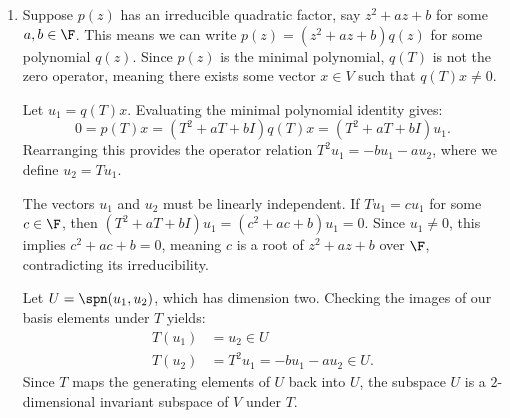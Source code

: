 \begin{solution}
\begin{enumerate}[label=\arabic*)]
\begin{itemize}
    To confirm linear independence, suppose $u=\alpha w$ for some
    $\alpha\in\F$. Then $(T-\lambda I)w=\alpha w$, so $w$ is an eigenvector of
    $T$ with eigenvalue $\lambda+\alpha$. But then
    $(T-\lambda I)^2w=\alpha^2w$. Since $(T-\lambda I)^2w=0$ and $w\ne0$, this
    forces $\alpha=0$, contradicting our deduction that $\alpha\ne0$ (since
    $u\ne0$). Therefore, $u$ and $w$ are linearly independent, and
    $\spn(u,w)$ is a $2$-dimensional invariant subspace of $V$ under $T$.
  \item Distinct linear factor: $p(z)=(z-\lambda)(z-\mu)g(z)$ with
    $\lambda\ne\mu$. Then $T$ has two distinct eigenvalues, yielding two
    linearly independent eigenvectors $v$ and $u$. The subspace $\spn(v,u)$
    is $2$-dimensional, and since $Tv=\lambda v\in\spn(v,u)$ and
    $Tu=\mu u\in\spn(v,u)$, it is explicitly invariant.
  \end{itemize}
\item Suppose $p(z)$ has an irreducible quadratic factor, say $z^2+az+b$ for
  some $a,b\in\F$. This means we can write $p(z)=(z^2+az+b)q(z)$ for some
  polynomial $q(z)$. Since $p(z)$ is the minimal polynomial, $q(T)$ is not the
  zero operator, meaning there exists some vector $x\in V$ such that
  $q(T)x\ne0$.

  Let $u_1=q(T)x$. Evaluating the minimal polynomial identity gives:
  \[ 0=p(T)x=(T^2+aT+bI)q(T)x=(T^2+aT+bI)u_1. \]
  Rearranging this provides the operator relation $T^2u_1=-bu_1-au_2$, where
  we define $u_2=Tu_1$.

  The vectors $u_1$ and $u_2$ must be linearly independent. If $Tu_1=cu_1$ for
  some $c\in\F$, then $(T^2+aT+bI)u_1=(c^2+ac+b)u_1=0$. Since $u_1\ne0$, this
  implies $c^2+ac+b=0$, meaning $c$ is a root of $z^2+az+b$ over $\F$,
  contradicting its irreducibility.

  Let $U=\spn(u_1,u_2)$, which has dimension two. Checking the images of our
  basis elements under $T$ yields:
  \begin{align*}
  T(u_1) &= u_2\in U\\
  T(u_2) &= T^2u_1=-bu_1-au_2\in U.
  \end{align*}
  Since $T$ maps the generating elements of $U$ back into $U$, the subspace
  $U$ is a $2$-dimensional invariant subspace of $V$ under $T$.
\end{enumerate}
\end{solution}
